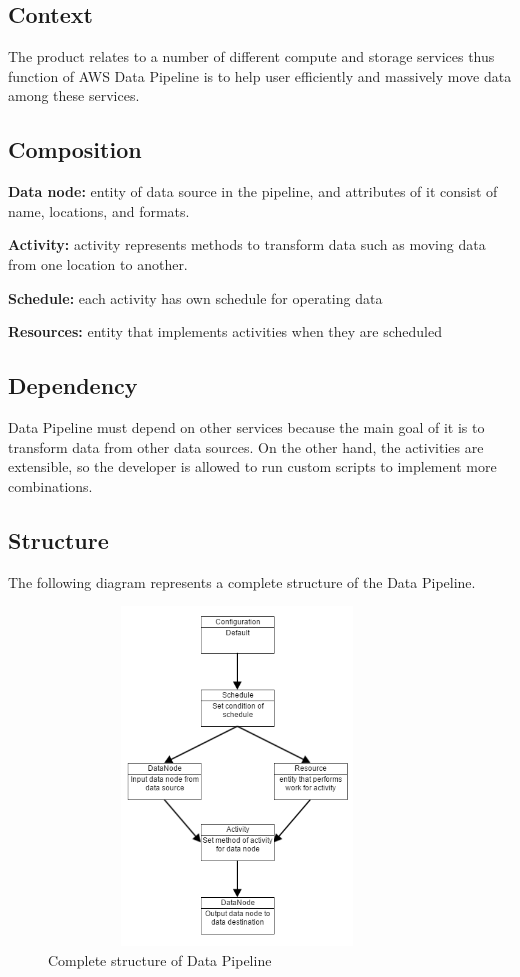	\subsection{Context}
    The product relates to a number of different compute and storage services thus function of AWS Data Pipeline is to help user efficiently and massively move data among these services.
     
     \subsection{Composition}
     \textbf{Data node:} entity of data source in the pipeline, and attributes of it consist of name, locations, and formats\cite{z5}. 
     
     \noindent\textbf{Activity:} activity represents methods to transform data such as moving data from one location to another. 
     
     \noindent\textbf{Schedule:} each activity has own schedule for operating data
     
     \noindent\textbf{Resources:} entity that implements activities when they are scheduled 
     
	\subsection{Dependency}
	Data Pipeline must depend on other services because the main goal of it is to transform data from other data sources. On the other hand, the activities are extensible, so the developer is allowed to run custom scripts to implement more combinations.
     
    	\subsection{Structure}
	The following diagram represents a complete structure of the Data Pipeline. 

    \begin{figure}[h]
        \includegraphics[width=10cm, height=9cm]{data_pipeline.png}
        \centering
        \caption{Complete structure of Data Pipeline}
    \end{figure}
    
